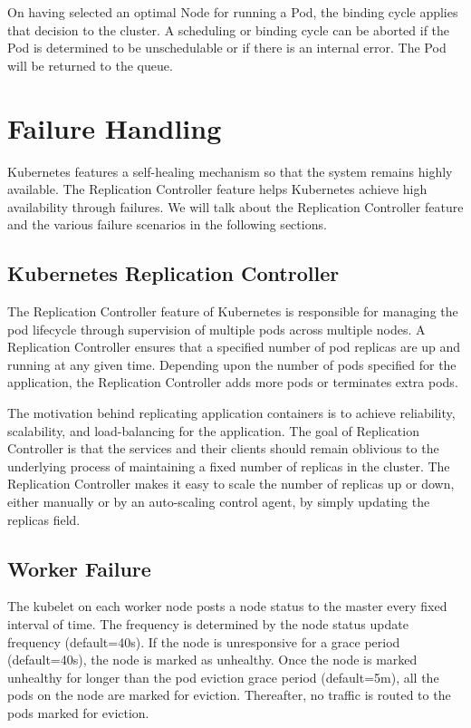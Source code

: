 \documentclass[sigconf]{acmart}
\begin{document}
On having selected an optimal Node for running a Pod, the binding cycle applies that decision to the cluster. A scheduling or binding cycle can be aborted if the Pod is determined to be unschedulable or if there is an internal error. The Pod will be returned to the queue.

\section{Failure Handling}
Kubernetes features a self-healing mechanism so that the system remains highly available. The Replication Controller feature helps Kubernetes achieve high availability through failures. We will talk about the Replication Controller feature and the various failure scenarios in the following sections.

\subsection{Kubernetes Replication Controller}
The Replication Controller feature of Kubernetes is responsible for managing the pod lifecycle through supervision of multiple pods across multiple nodes.\cite{ReplicationControllers} A Replication Controller ensures that a specified number of pod replicas are up and running at any given time. Depending upon the number of pods specified for the application, the Replication Controller adds more pods or terminates extra pods.

The motivation behind replicating application containers is to achieve reliability, scalability, and load-balancing for the application. The goal of Replication Controller is that the services and their clients should remain oblivious to the underlying process of maintaining a fixed number of replicas in the cluster. The Replication Controller makes it easy to scale the number of replicas up or down, either manually or by an auto-scaling control agent, by simply updating the replicas field.


\subsection{Worker Failure}
The kubelet on each worker node posts a node status to the master every fixed interval of time. The frequency is determined by the node status update frequency (default=40s). If the node is unresponsive for a grace period (default=40s), the node is marked as unhealthy. Once the node is marked unhealthy for longer than the pod eviction grace period (default=5m), all the pods on the node are marked for eviction. Thereafter, no traffic is routed to the pods marked for eviction.
\end{document}
